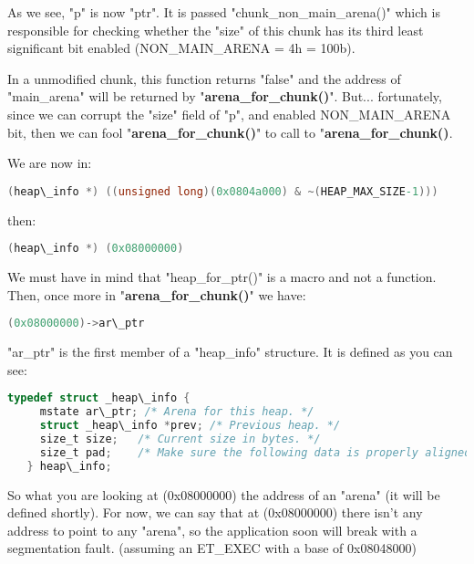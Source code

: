 \documentclass[12pt]{article}
\begin{document}
As we see, "p" is now "ptr". It is passed "chunk\_non\_main\_arena()"
which is responsible for checking whether the "size" of this chunk has
its third least significant bit enabled (NON\_MAIN\_ARENA = 4h = 100b).
\newline


In a unmodified chunk, this function returns "false" and the address of
"main\_arena" will be returned by "\textbf{arena\_for\_chunk()}". But... fortunately,
since we can corrupt the "size" field of "p", and enabled NON\_MAIN\_ARENA
bit, then we can fool "\textbf{arena\_for\_chunk()}" to call to "\textbf{arena\_for\_chunk()}.
\newline


We are now in:
\newline


\begin{lstlisting}[language=C]
   (heap\_info *) ((unsigned long)(0x0804a000) & ~(HEAP_MAX_SIZE-1)))
\end{lstlisting}   



   then:
   \newline


\begin{lstlisting}[language=C]
   (heap\_info *) (0x08000000)
\end{lstlisting}



We must have in mind that "heap\_for\_ptr()" is a macro and not a function.
Then, once more in "\textbf{arena\_for\_chunk()}" we have:
\newline


\begin{lstlisting}[language=C]
   (0x08000000)->ar\_ptr
\end{lstlisting}



"ar\_ptr" is the first member of a "heap\_info" structure. It is defined
as you can see:
\newline


\begin{lstlisting}[language=C]
   typedef struct _heap\_info {
     mstate ar\_ptr; /* Arena for this heap. */
     struct _heap\_info *prev; /* Previous heap. */
     size_t size;   /* Current size in bytes. */
     size_t pad;    /* Make sure the following data is properly aligned. */
   } heap\_info;
\end{lstlisting}



So what you are looking at (0x08000000) the address of an "arena" (it will
be defined shortly). For now, we can say that at (0x08000000) there isn't
any address to point to any "arena", so the application soon will break
with a segmentation fault. (assuming an ET\_EXEC with a base of 0x08048000)
\newline
\end{document}
